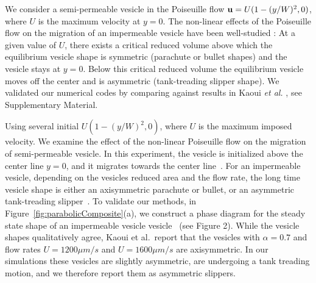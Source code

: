 \documentclass[9pt,twocolumn,twoside,lineno]{pnas-new}
\begin{document}
We consider a semi-permeable vesicle in the Poiseuille flow $\mathbf{u} =
U(1-(y/W)^2,0)$, where $U$ is the maximum velocity at $y=0$. The non-linear effects of the Poiseuille flow
on the migration of an impermeable vesicle have been well-studied \cite{kao-bir-mis2009}: At a given value of $U$,
there exists a critical reduced volume above which the equilibrium vesicle shape is symmetric (parachute or bullet shapes) and the vesicle stays at $y=0$.
Below this critical reduced volume the equilibrium vesicle moves off the center and is asymmetric (tank-treading slipper shape).
We validated our numerical codes by comparing against results in Kaoui {\it et al.} \cite{kao-bir-mis2009}, see Supplementary Material.

%
%
%
%

Using several initial
$U(1-(y/W)^2,0)$, where $U$ is the maximum imposed velocity. We examine
the effect of the non-linear Poiseuille flow on the migration of
semi-permeable vesicle. In this experiment, the vesicle is initialized
above the center line $y=0$, and it migrates towards the center
line~\cite{dan-vla-mis2009}. For an impermeable vesicle, depending on
the vesicles reduced area and the flow rate, the long time vesicle shape
is either an axisymmetric parachute or bullet, or an asymmetric
tank-treading slipper~\cite{kao-bir-mis2009}. To validate our methods,
in Figure~\ref{fig:parabolicComposite}(a), we construct a phase diagram
for the steady state shape of an impermeable vesicle
vesicle~\cite{kao-bir-mis2009} (see Figure 2). While the vesicle shapes
qualitatively agree, Kaoui et al.~report that the vesicles with
$\alpha=0.7$ and flow rates $U = 1200 \mu m/s$ and $U = 1600 \mu m/s$ are
axisymmetric. In our simulations these vesicles are slightly asymmetric,
are undergoing a tank treading motion, and we therefore report them as
asymmetric slippers.
\end{document}
